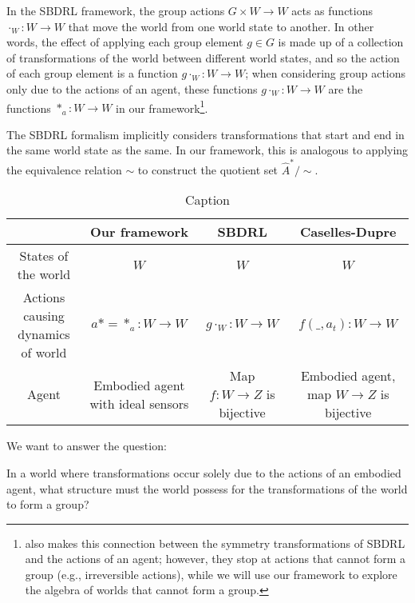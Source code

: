 In the SBDRL framework, the group actions $G \times W \to W$ acts as functions $\cdot_{W}: W \to W$ that move the world from one world state to another.
In other words, the effect of applying each group element $g \in G$ is made up of a collection of transformations of the world between different world states, and so the action of each group element is a function $g \cdot_{W}: W \to W$; when considering group actions only due to the actions of an agent, these functions $g \cdot_{W}: W \to W$ are the functions $*_{a}: W \to W$ in our framework\footnote{\autocite{caselles2019symmetry} also makes this connection between the symmetry transformations of SBDRL and the actions of an agent; however, they stop at actions that cannot form a group (e.g., irreversible actions), while we will use our framework to explore the algebra of worlds that cannot form a group.}.

The SBDRL formalism implicitly considers transformations that
start and end in the same world state as the same.
In our framework, this is analogous to applying the equivalence relation $\sim$ to construct the quotient set $\hat{A}^{*}/\sim$.

\begin{table}[H]
	\centering
	\begin{tabular}{|c|c|c|c|}
		                                  & Our framework                     & SBDRL                         & Caselles-Dupre                             \\
		\hline
		States of the world               & $W$                               & $W$                           & $W$                                        \\
		Actions causing dynamics of world & $a* = *_{a}: W \to W$             & $g \cdot_{W}: W \to W$        & $f(\_, a_{t}): W \to W$                    \\
		Agent                             & Embodied agent with ideal sensors & Map $f: W \to Z$ is bijective & Embodied agent, map $W \to Z$ is bijective
	\end{tabular}
	\caption{Caption}
	\label{tab:my_label}
\end{table}

We want to answer the question:
\begin{center}
	In a world where transformations occur solely due to the actions of an embodied agent, what structure must the world possess for the transformations of the world to form a group?
\end{center}


